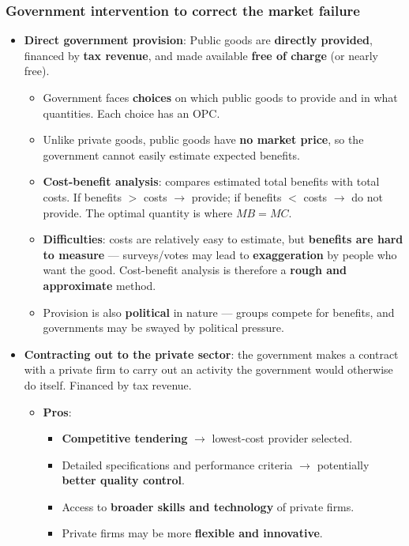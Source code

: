\subsubsection*{Government intervention to correct the market failure}
\begin{itemize}
  \item \textbf{Direct government provision}: Public goods are \textbf{directly provided}, financed by \textbf{tax revenue}, and made available \textbf{free of charge} (or nearly free).
  \begin{itemize}
    \item Government faces \textbf{choices} on which public goods to provide and in what quantities. Each choice has an OPC.
    \item Unlike private goods, public goods have \textbf{no market price}, so the government cannot easily estimate expected benefits.
    \item \textbf{Cost-benefit analysis}: compares estimated total benefits with total costs. If benefits $>$ costs $\to$ provide; if benefits $<$ costs $\to$ do not provide. The optimal quantity is where $MB = MC$.
    \item \textbf{Difficulties}: costs are relatively easy to estimate, but \textbf{benefits are hard to measure} --- surveys/votes may lead to \textbf{exaggeration} by people who want the good. Cost-benefit analysis is therefore a \textbf{rough and approximate} method.
    \item Provision is also \textbf{political} in nature --- groups compete for benefits, and governments may be swayed by political pressure.
  \end{itemize}
  \item \textbf{Contracting out to the private sector}: the government makes a contract with a private firm to carry out an activity the government would otherwise do itself. Financed by tax revenue.
  \begin{itemize}
    \item \textbf{Pros}:
    \begin{itemize}
      \item \textbf{Competitive tendering} $\to$ lowest-cost provider selected.
      \item Detailed specifications and performance criteria $\to$ potentially \textbf{better quality control}.
      \item Access to \textbf{broader skills and technology} of private firms.
      \item Private firms may be more \textbf{flexible and innovative}.

\end{itemize}
\end{itemize}
\end{itemize}

